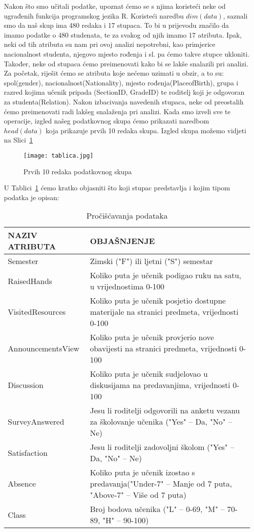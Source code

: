 \documentclass[times, utf8, zavrsni, numeric]{fer}
\begin{document}
Nakon što smo učitali podatke, upoznat ćemo se s njima koristeći neke od ugrađenih funkcija programskog jezika R. 
Koristeći naredbu $dim(data)$, saznali smo da naš skup ima 480 redaka i 17 stupaca. To bi u prijevodu značilo da imamo podatke o 480 studenata, te za svakog od njih imamo 17 atributa. Ipak, neki od tih atributa su nam pri ovoj analizi nepotrebni, kao primjerice nacionalnost studenta, njegovo mjesto rođenja i sl. pa ćemo takve stupce ukloniti. Također, neke od stupaca ćemo preimenovati kako bi se lakše snalazili pri analizi. Za početak, riješit ćemo se atributa koje nećemo uzimati u obzir, a to su: spol(gender), nacionalnost(Nationality), mjesto rođenja(PlaceofBirth), grupa i razred kojima učenik pripada (SectionID, GradeID) te roditelj koji je odgovoran za studenta(Relation). Nakon izbacivanja navedenih stupaca, neke od preostalih ćemo preimenovati radi lakšeg snalaženja pri analizi. Kada smo izveli sve te operacije, izgled našeg podatkovnog skupa ćemo prikazati naredbom $head(data) $ koja prikazuje prvih 10 redaka skupa. Izgled skupa možemo vidjeti na Slici~\ref{fig:tablica}
\begin{figure}[H]
\centering
\texttt{[image: tablica.jpg]}
\caption{Prvih 10 redaka podatkovnog skupa}
\label{fig:tablica}
\end{figure}
U Tablici~\ref{fig:objašnjenje} ćemo kratko objasniti što koji stupac predstavlja i kojim tipom podatka je opisan:
\begin{table}[H]
\caption{Pročišćavanja podataka}
\begin{tabular}{| l | p{8cm} |}
    \hline
    \textbf{NAZIV ATRIBUTA} & \textbf{OBJAŠNJENJE} \\ \hline
    Semester & Zimski ("F") ili ljetni ("S") semestar \\ \hline
    RaisedHands & Koliko puta je učenik podigao ruku na satu, u vrijednostima 0-100\\ \hline
    VisitedResources & Koliko puta je učenik posjetio dostupne materijale na stranici predmeta, vrijednosti 0-100 \\
    \hline
        AnnouncementsView & Koliko puta je učenik provjerio nove obavijesti na stranici predmeta, vrijednosti 0-100 \\
    \hline
        Discussion & Koliko puta je učenik sudjelovao u diskusijama na predavanjima, vrijednosti 0-100 \\
    \hline
        SurveyAnswered & Jesu li roditelji odgovorili na anketu vezanu za školovanje učenika ("Yes" – Da, "No" – Ne) \\
    \hline
Satisfaction & Jesu li roditelji zadovoljni školom ("Yes" – Da, "No" – Ne) \\
    \hline
        Absence & Koliko puta je učenik izostao s predavanja("Under-7" – Manje od 7 puta, "Above-7" – Više od 7 puta) \\
    \hline
        Class & Broj bodova učenika ("L" – 0-69, "M" – 70-89, "H" – 90-100) \\
    \hline
\end{tabular}
\label{fig:objašnjenje}
\end{table}
\end{document}
